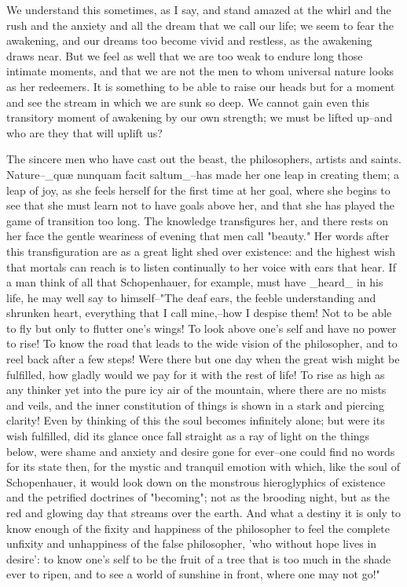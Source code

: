 We understand this sometimes, as I say, and stand amazed at the whirl
and the rush and the anxiety and all the dream that we call our life;
we seem to fear the awakening, and our dreams too become vivid and
restless, as the awakening draws near. But we feel as well that we
are too weak to endure long those intimate moments, and that we are
not the men to whom universal nature looks as her redeemers. It is
something to be able to raise our heads but for a moment and see the
stream in which we are sunk so deep. We cannot gain even this
transitory moment of awakening by our own strength; we must be lifted
up--and who are they that will uplift us?

The sincere men who have cast out the beast, the philosophers,
artists and saints. Nature--_quæ nunquam facit saltum_--has made her
one leap in creating them; a leap of joy, as she feels herself for
the first time at her goal, where she begins to see that she must
learn not to have goals above her, and that she has played the game
of transition too long. The knowledge transfigures her, and there
rests on her face the gentle weariness of evening that men call
"beauty." Her words after this transfiguration are as a great light
shed over existence: and the highest wish that mortals can reach is
to listen continually to her voice with ears that hear. If a man
think of all that Schopenhauer, for example, must have _heard_ in his
life, he may well say to himself--"The deaf ears, the feeble
understanding and shrunken heart, everything that I call mine,--how I
despise them! Not to be able to fly but only to flutter one's wings!
To look above one's self and have no power to rise! To know the road
that leads to the wide vision of the philosopher, and to reel back
after a few steps! Were there but one day when the great wish might
be fulfilled, how gladly would we pay for it with the rest of life!
To rise as high as any thinker yet into the pure icy air of the
mountain, where there are no mists and veils, and the inner
constitution of things is shown in a stark and piercing clarity! Even
by thinking of this the soul becomes infinitely alone; but were its
wish fulfilled, did its glance once fall straight as a ray of light
on the things below, were shame and anxiety and desire gone for
ever--one could find no words for its state then, for the mystic and
tranquil emotion with which, like the soul of Schopenhauer, it would
look down on the monstrous hieroglyphics of existence and the
petrified doctrines of "becoming"; not as the brooding night, but as
the red and glowing day that streams over the earth. And what a
destiny it is only to know enough of the fixity and happiness of the
philosopher to feel the complete unfixity and unhappiness of the
false philosopher, 'who without hope lives in desire': to know one's
self to be the fruit of a tree that is too much in the shade ever to
ripen, and to see a world of sunshine in front, where one may not
go!"

